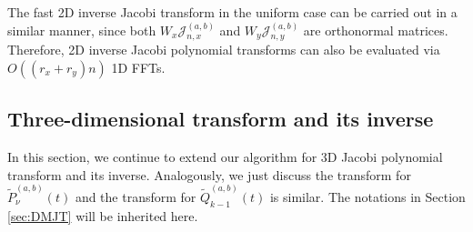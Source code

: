 \documentclass[11pt]{article}
\begin{document}
The fast 2D inverse Jacobi transform in the uniform case can be carried out in a similar manner, since both $W_{x}\mathcal{J}_{n,x}^{(a,b)}$ and $W_{y}\mathcal{J}_{n,y}^{(a,b)}$ are orthonormal matrices. {} Therefore, 2D inverse Jacobi polynomial transforms can also be evaluated via $O((r_{x}+r_{y})n)$ 1D FFTs.

\subsection{Three-dimensional transform and its inverse} 
\label{sec:TMJT}
In this section, we continue to extend our algorithm for 3D Jacobi polynomial transform and its inverse. Analogously, we just discuss the transform for $\tilde{P}_{\nu}^{(a,b)}(t)$ and the transform for $\tilde{Q}_{k-1}^{(a,b)}(t)$ is similar. {\color{blue}{Just as the 2D case, we mainly focus on those transforms with a tensor-product structure.}} The notations in Section \ref{sec:DMJT} will be inherited here.
\end{document}
